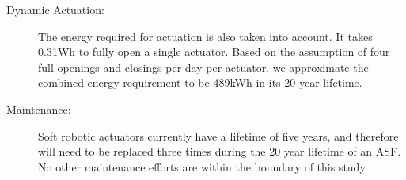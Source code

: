 \begin{description}

\item[Dynamic Actuation: ] The energy required for actuation is also taken into account. It takes 0.31Wh to fully open a single actuator. Based on the assumption of four full openings and closings per day per actuator, we approximate the combined energy requirement to be 489kWh in its 20 year lifetime. 

\item[Maintenance: ] Soft robotic actuators currently have a lifetime of five years, and therefore will need to be replaced three times during the 20 year lifetime of an ASF. No other maintenance efforts are within the boundary of this study.


\end{description}
